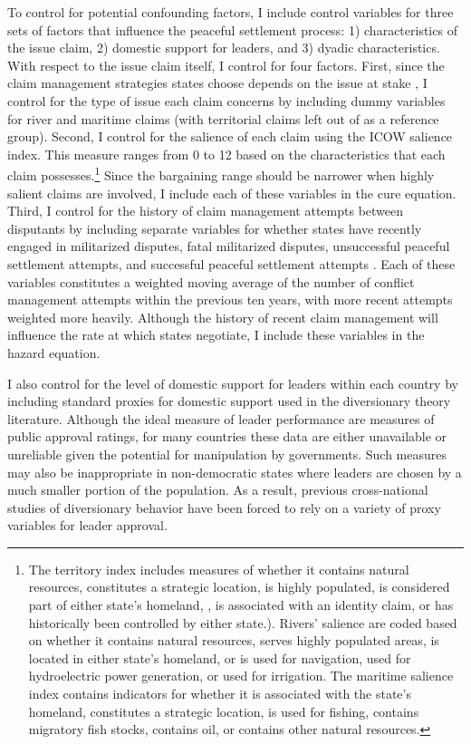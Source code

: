 To control for potential confounding factors, I include control variables for three sets of factors that influence the peaceful settlement process: 1) characteristics of the issue claim, 2) domestic support for leaders, and 3) dyadic characteristics. With respect to the issue claim itself, I control for four factors. First, since the claim management strategies states choose depends on the issue at stake \citep{hensel2008, owsiak2017}, I control for the type of issue each claim concerns by including dummy variables for river and maritime claims (with territorial claims left out of as a reference group). Second, I control for the salience of each claim using the ICOW salience index. This measure ranges from 0 to 12 based on the characteristics that each claim possesses.\footnote{The territory index includes measures of whether it contains natural resources, constitutes a strategic location, is highly populated, is considered part of either state’s homeland, , is associated with an identity claim, or has historically been controlled by either state.). Rivers’ salience are coded based on whether it contains natural resources, serves highly populated areas, is located in either state’s homeland, or is used for navigation, used for hydroelectric power generation, or used for irrigation. The maritime salience index contains indicators for whether it is associated with the state’s homeland, constitutes a strategic location, is used for fishing, contains migratory fish stocks, contains oil, or contains other natural resources.} Since the bargaining range should be narrower when highly salient claims are involved, I include each of these variables in the cure equation. Third, I control for the history of claim management attempts between disputants by including separate variables for whether states have recently engaged in militarized disputes, fatal militarized disputes, unsuccessful peaceful settlement attempts, and successful peaceful settlement attempts \citep{hensel2001, hensel2008}. Each of these variables constitutes a weighted moving average of the number of conflict management attempts within the previous ten years, with more recent attempts weighted more heavily. Although the history of recent claim management will influence the rate at which states negotiate, I include these variables in the hazard equation.


I also control for the level of domestic support for leaders within each country by including standard proxies for domestic support used in the diversionary theory literature. Although the ideal measure of leader performance are measures of public approval ratings, for many countries these data are either unavailable or unreliable given the potential for manipulation by governments. Such measures may also be inappropriate in non-democratic states where leaders are chosen by a much smaller portion of the population. As a result, previous cross-national studies of diversionary behavior have been forced to rely on a variety of proxy variables for leader approval.


